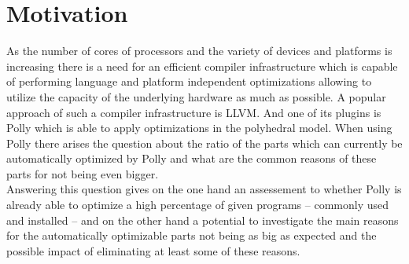 \chapter{Motivation}
As the number of cores of processors and the variety of devices and platforms is increasing there is a need for an efficient compiler infrastructure which is capable of performing language and platform independent optimizations allowing to utilize the capacity of the underlying hardware as much as possible.
A popular approach of such a compiler infrastructure is LLVM.
And one of its plugins is Polly which is able to apply optimizations in the polyhedral model.
When using Polly there arises the question about the ratio of the parts which can currently be automatically optimized by Polly and what are the common reasons of these parts for not being even bigger.\\
Answering this question gives on the one hand an assessement to whether Polly is already able to optimize a high percentage of given programs -- commonly used and installed -- and on the other hand a potential to investigate the main reasons for the automatically optimizable parts not being as big as expected and the possible impact of eliminating at least some of these reasons.

